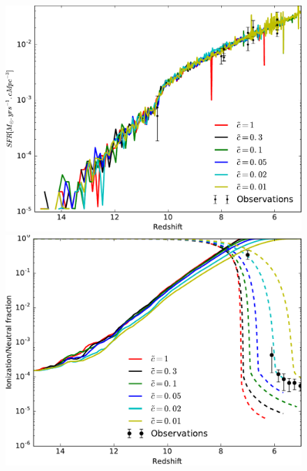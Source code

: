 
\begin{figure}
        \includegraphics[height=.3\textheight]{img/04_mapreio/SFR.pdf} 
        \includegraphics[height=.3\textheight]{img/04_mapreio/xion.pdf} 

\end{figure}
